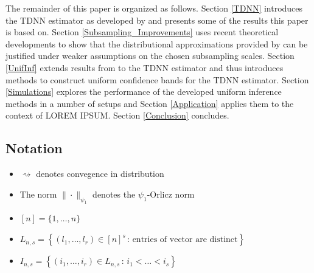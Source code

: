 \documentclass[letterpaper,10pt]{article}
\numberwithin{equation}{section}
\numberwithin{thm}{section}
\newcommand{\1}{\mathbb{1}}
\begin{document}
The remainder of this paper is organized as follows.
Section \ref{TDNN} introduces the TDNN estimator as developed by \citet{demirkaya_optimal_2024} and presents some of the results this paper is based on.
Section \ref{Subsampling_Improvements} uses recent theoretical developments to show that the distributional approximations provided by \citet{demirkaya_optimal_2024} can be justified under weaker assumptions on the chosen subsampling scales.
Section \ref{UnifInf} extends results from \citet{ritzwoller_uniform_2024} to the TDNN estimator and thus introduces methods to construct uniform confidence bands for the TDNN estimator.
Section \ref{Simulations} explores the performance of the developed uniform inference methods in a number of setups and Section \ref{Application} applies them to the context of {\color{red} LOREM IPSUM}.
Section \ref{Conclusion} concludes.

\subsection{Notation}
\begin{itemize}
	\item $\rightsquigarrow$ denotes convegence in distribution
	\item The norm $\| \cdot \|_{\psi_1}$ denotes the $\psi_1$-Orlicz norm
	\item $[n] = \{1, \dotsc, n\}$
	\item $L_{n,s} = \left\{\left(l_1, \dotsc, l_r\right) \in [n]^{s} \, : \, \text{entries of vector are distinct} \right\}$
	\item $I_{n,s} = \left\{\left(i_1, \dotsc, i_r\right) \in L_{n,s} \, : \, i_1 < \dotsc < i_s \right\}$
\end{itemize}

\newpage
\end{document}
